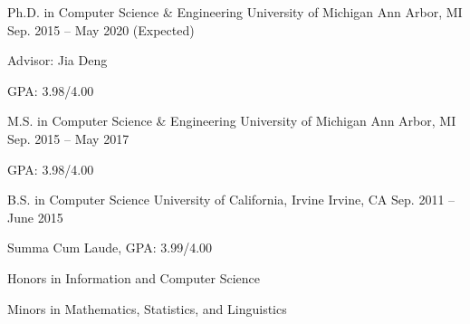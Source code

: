 \begin{cventries}
  \cventry
    {Ph.D. in Computer Science \& Engineering}
    {University of Michigan}
    {Ann Arbor, MI}
    {Sep. 2015 -- May 2020 (Expected)}
    {
      \begin{cvitems}
        \item {Advisor: Jia Deng}
        \item {GPA: 3.98/4.00}
      \end{cvitems}
    }
  \cventry
    {M.S. in Computer Science \& Engineering}
    {University of Michigan}
    {Ann Arbor, MI}
    {Sep. 2015 -- May 2017}
    {
      \begin{cvitems}
        \item {GPA: 3.98/4.00}
      \end{cvitems}
    }
  \cventry
    {B.S. in Computer Science}
    {University of California, Irvine}
    {Irvine, CA}
    {Sep. 2011 -- June 2015}
    {
      \begin{cvitems}
        \item {Summa Cum Laude, GPA: 3.99/4.00}
        \item {Honors in Information and Computer Science}
        \item {Minors in Mathematics, Statistics, and Linguistics}
      \end{cvitems}
    }
\end{cventries}
